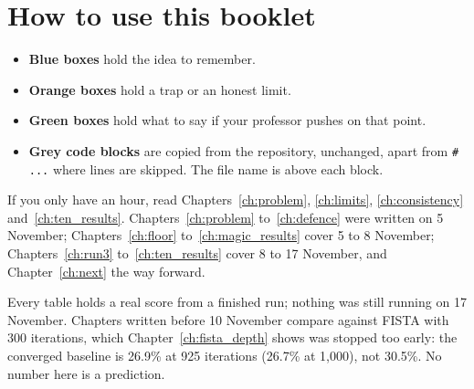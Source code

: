 \section*{How to use this booklet}

\begin{itemize}
\item \textbf{Blue boxes} hold the idea to remember.
\item \textbf{Orange boxes} hold a trap or an honest limit.
\item \textbf{Green boxes} hold what to say if your professor pushes on that point.
\item \textbf{Grey code blocks} are copied from the repository, unchanged, apart from
\texttt{\# ...} where lines are skipped. The file name is above each block.
\end{itemize}

If you only have an hour, read Chapters~\ref{ch:problem}, \ref{ch:limits}, \ref{ch:consistency}
and~\ref{ch:ten_results}. Chapters~\ref{ch:problem} to~\ref{ch:defence} were written on 5 November; Chapters~\ref{ch:floor}
to~\ref{ch:magic_results} cover 5 to 8 November; Chapters~\ref{ch:run3} to~\ref{ch:ten_results} cover 8 to 17 November, and Chapter~\ref{ch:next} the way forward.

\begin{careful}
Every table holds a real score from a finished run; nothing was still running on 17 November. Chapters written before
10 November compare against FISTA with 300 iterations, which Chapter~\ref{ch:fista_depth} shows was stopped too early: the
converged baseline is 26.9\% at 925 iterations (26.7\% at 1{,}000), not 30.5\%. No number here is a prediction.
\end{careful}
